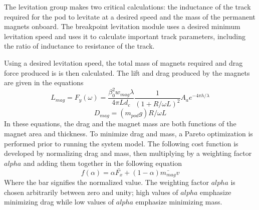 	The levitation group makes two critical calculations: the inductance of the
	track required for the pod to levitate at a desired speed and the mass of
	the permanent magnets onboard. The breakpoint levitation module uses a
	desired minimum levitation speed and uses it to calculate important track
	parameters, including the ratio of inductance to resistance of the track.

	Using a desired levitation speed, the total mass of magnets required and
	drag force produced is is then calculated. The lift and drag produced
	by the magnets are given in the equations
	\begin{equation}
		\label{eq:fy_lev}
		L_{mag} = F_{y}(\omega)=\frac{\beta _{0}^{2}w_{mag}\lambda}{4\pi Ld_{c}}\frac{1}{(1+R/\omega L)^{2}}A_ae^{-4\pi h/\lambda }
	\end{equation}
	\begin{equation}
		\label{eq:dmag}
		D_{mag}=( m_{pod}g)R/\omega L
	\end{equation}
	In these equations, the drag and the magnet mass are both functions of the
	magnet area and thickness. To minimize drag and mass, a Pareto optimization
	is performed prior to running the system model. The following cost function
	is developed by normalizing drag and mass, then multiplying by a weighting
	factor $alpha$ and adding them together in the following equation
	\begin{equation}
		\label{eq:pareto}
		f(\alpha ) = \alpha \bar{F_{x}} + (1-\alpha )\bar{m_{mag}}v
	\end{equation}
	Where the bar signifies the normalized value. The weighting factor $alpha$
	is chosen arbitrarily between zero and unity; high values of $alpha$
	emphasize minimizing drag while low values of $alpha$ emphasize minimizing mass.




